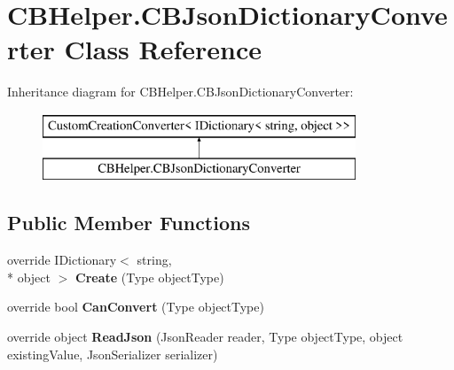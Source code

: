 \section{C\-B\-Helper.\-C\-B\-Json\-Dictionary\-Converter Class Reference}
\label{class_c_b_helper_1_1_c_b_json_dictionary_converter}
Inheritance diagram for C\-B\-Helper.\-C\-B\-Json\-Dictionary\-Converter\-:\begin{figure}[H]
\begin{center}
\leavevmode
\includegraphics[height=2.000000cm]{class_c_b_helper_1_1_c_b_json_dictionary_converter}
\end{center}
\end{figure}
\subsection*{Public Member Functions}
\begin{DoxyCompactItemize}
\item 
override I\-Dictionary$<$ string, \\*
object $>$ {\bfseries Create} (Type object\-Type)\label{class_c_b_helper_1_1_c_b_json_dictionary_converter_a2ce75844d7939f79ddda26e042431498}

\item 
override bool {\bfseries Can\-Convert} (Type object\-Type)\label{class_c_b_helper_1_1_c_b_json_dictionary_converter_a846df79a8f1f2eabf5a032e1abe0c2a4}

\item 
override object {\bfseries Read\-Json} (Json\-Reader reader, Type object\-Type, object existing\-Value, Json\-Serializer serializer)\label{class_c_b_helper_1_1_c_b_json_dictionary_converter_af6200fc868c11684df877aeea431671d}

\end{DoxyCompactItemize}
